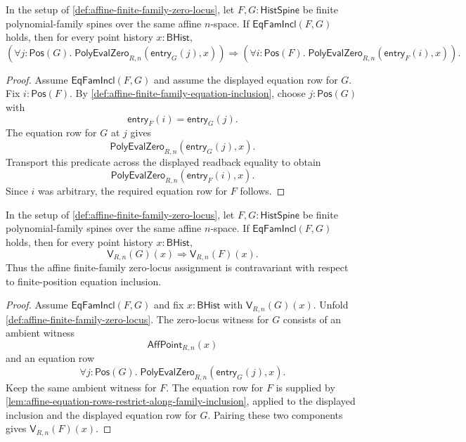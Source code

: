 \begin{lemma}
\label{lem:affine-equation-rows-restrict-along-family-inclusion}
In the setup of \autoref{def:affine-finite-family-zero-locus}, let $F,G:\mathsf{HistSpine}$ be finite polynomial-family spines over the same affine $n$-space. If $\mathsf{EqFamIncl}(F,G)$ holds, then for every point history $x:\mathsf{BHist}$,
$$
\left(\forall j:\mathsf{Pos}(G).\;
\mathsf{PolyEvalZero}_{R,n}(\mathsf{entry}_{G}(j),x)\right)
\Longrightarrow
\left(\forall i:\mathsf{Pos}(F).\;
\mathsf{PolyEvalZero}_{R,n}(\mathsf{entry}_{F}(i),x)\right).
$$
\end{lemma}
\begin{proof}
Assume $\mathsf{EqFamIncl}(F,G)$ and assume the displayed equation row for $G$. Fix $i:\mathsf{Pos}(F)$. By \autoref{def:affine-finite-family-equation-inclusion}, choose $j:\mathsf{Pos}(G)$ with
$$
\mathsf{entry}_{F}(i)=\mathsf{entry}_{G}(j).
$$
The equation row for $G$ at $j$ gives
$$
\mathsf{PolyEvalZero}_{R,n}(\mathsf{entry}_{G}(j),x).
$$
Transport this predicate across the displayed readback equality to obtain
$$
\mathsf{PolyEvalZero}_{R,n}(\mathsf{entry}_{F}(i),x).
$$
Since $i$ was arbitrary, the required equation row for $F$ follows.
\end{proof}

\begin{theorem}
\label{thm:affine-finite-family-inclusion-reverses-zero-loci}
In the setup of \autoref{def:affine-finite-family-zero-locus}, let $F,G:\mathsf{HistSpine}$ be finite polynomial-family spines over the same affine $n$-space. If $\mathsf{EqFamIncl}(F,G)$ holds, then for every point history $x:\mathsf{BHist}$,
$$
\mathsf{V}_{R,n}(G)(x)
\Longrightarrow
\mathsf{V}_{R,n}(F)(x).
$$
Thus the affine finite-family zero-locus assignment is contravariant with respect to finite-position equation inclusion.
\end{theorem}
\begin{proof}
Assume $\mathsf{EqFamIncl}(F,G)$ and fix $x:\mathsf{BHist}$ with $\mathsf{V}_{R,n}(G)(x)$. Unfold \autoref{def:affine-finite-family-zero-locus}. The zero-locus witness for $G$ consists of an ambient witness
$$
\mathsf{AffPoint}_{R,n}(x)
$$
and an equation row
$$
\forall j:\mathsf{Pos}(G).\;
\mathsf{PolyEvalZero}_{R,n}(\mathsf{entry}_{G}(j),x).
$$
Keep the same ambient witness for $F$. The equation row for $F$ is supplied by \autoref{lem:affine-equation-rows-restrict-along-family-inclusion}, applied to the displayed inclusion and the displayed equation row for $G$. Pairing these two components gives $\mathsf{V}_{R,n}(F)(x)$.
\end{proof}

